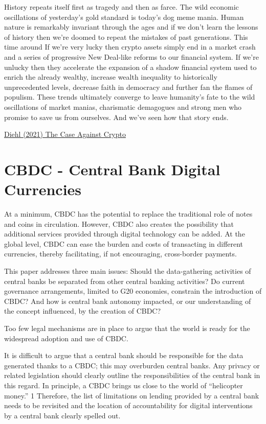 \documentclass[
]{book}
\begin{document}
History repeats itself first as tragedy and then as farce. The wild economic oscillations of yesterday's gold standard is today's dog meme mania. Human nature is remarkably invariant through the ages and if we don't learn the lessons of history then we're doomed to repeat the mistakes of past generations. This time around If we're very lucky then crypto assets simply end in a market crash and a series of progressive New Deal-like reforms to our financial system. If we're unlucky then they accelerate the expansion of a shadow financial system used to enrich the already wealthy, increase wealth inequality to historically unprecedented levels, decrease faith in democracy and further fan the flames of populism. These trends ultimately converge to leave humanity's fate to the wild oscillations of market manias, charismatic demagogues and strong men who promise to save us from ourselves. And we've seen how that story ends.

\href{https://www.stephendiehl.com/blog/against-crypto.html}{Diehl (2021) The Case Against Crypto}

\hypertarget{cbdc---central-bank-digital-currencies}{%
\section{CBDC - Central Bank Digital Currencies}\label{cbdc---central-bank-digital-currencies}}

At a minimum,
CBDC has the potential to replace the traditional
role of notes and coins in circulation. However,
CBDC also creates the possibility that additional
services provided through digital technology
can be added. At the global level, CBDC can ease
the burden and costs of transacting in different
currencies, thereby facilitating, if not encouraging,
cross-border payments.

This paper addresses three main issues: Should
the data-gathering activities of central banks be
separated from other central banking activities?
Do current governance arrangements, limited
to G20 economies, constrain the introduction
of CBDC? And how is central bank autonomy
impacted, or our understanding of the concept
influenced, by the creation of CBDC?

Too few legal mechanisms are in place to argue that
the world is ready for the widespread adoption
and use of CBDC.

It is difficult to argue that a central bank
should be responsible for the data generated
thanks to a CBDC; this may overburden central
banks. Any privacy or related legislation should
clearly outline the responsibilities of the central
bank in this regard. In principle, a CBDC brings
us close to the world of ``helicopter money.'' 1
Therefore, the list of limitations on lending
provided by a central bank needs to be revisited
and the location of accountability for digital
interventions by a central bank clearly spelled out.
\end{document}
